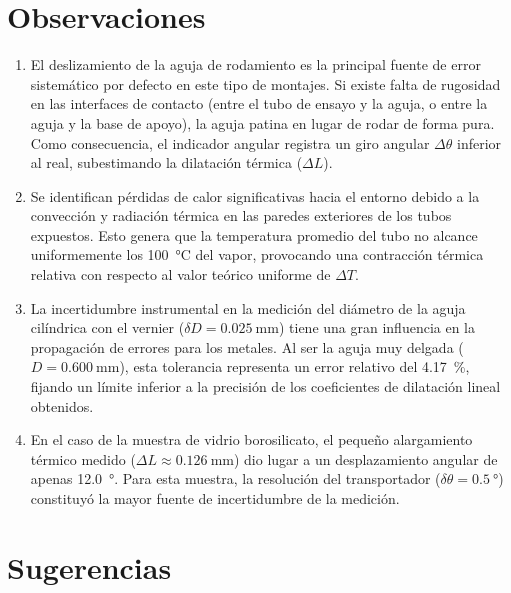 
\section{Observaciones}

\begin{enumerate}
    \item El deslizamiento de la aguja de rodamiento es la principal fuente de error sistemático por defecto en este tipo de montajes. Si existe falta de rugosidad en las interfaces de contacto (entre el tubo de ensayo y la aguja, o entre la aguja y la base de apoyo), la aguja patina en lugar de rodar de forma pura. Como consecuencia, el indicador angular registra un giro angular $\Delta\theta$ inferior al real, subestimando la dilatación térmica ($\Delta L$).
    \item Se identifican pérdidas de calor significativas hacia el entorno debido a la convección y radiación térmica en las paredes exteriores de los tubos expuestos. Esto genera que la temperatura promedio del tubo no alcance uniformemente los \qty{100}{\celsius} del vapor, provocando una contracción térmica relativa con respecto al valor teórico uniforme de $\Delta T$.
    \item La incertidumbre instrumental en la medición del diámetro de la aguja cilíndrica con el vernier ($\delta D = \qty{0,025}{\milli\meter}$) tiene una gran influencia en la propagación de errores para los metales. Al ser la aguja muy delgada ($D = \qty{0,600}{\milli\meter}$), esta tolerancia representa un error relativo del \qty{4,17}{\percent}, fijando un límite inferior a la precisión de los coeficientes de dilatación lineal obtenidos.
    \item En el caso de la muestra de vidrio borosilicato, el pequeño alargamiento térmico medido ($\Delta L \approx \qty{0,126}{\milli\meter}$) dio lugar a un desplazamiento angular de apenas \qty{12,0}{\degree}. Para esta muestra, la resolución del transportador ($\delta\theta = \qty{0,5}{\degree}$) constituyó la mayor fuente de incertidumbre de la medición.
\end{enumerate}

\section{Sugerencias}

